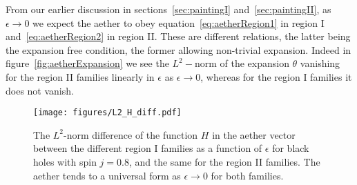 \documentclass[12pt]{article}
\numberwithin{equation}{section}
\begin{document}
From our earlier discussion in  sections~\ref{sec:paintingI} and~\ref{sec:paintingII}, as $\epsilon \to 0$  we expect the aether to obey equation~\eqref{eq:aetherRegion1} in region I and~\eqref{eq:aetherRegion2} in region II. These are different relations, the latter being the expansion free condition, the former allowing non-trivial expansion. Indeed in figure~\ref{fig:aetherExpansion} we see the $L^2-$norm of the expansion $\theta$ vanishing for the region II families linearly in $\epsilon$ as $\epsilon \to 0$, whereas for the region I families it does not vanish. 


\begin{figure}
\centerline{
  \texttt{[image: figures/L2\_H\_diff.pdf]}
  }
  \caption{\label{fig:aetherLimit}
 The $L^2$-norm difference of the function  $H$ in the aether vector between the different region I families as a function of  $\epsilon$ for black holes with spin $j=0.8$, and the same for the region II families. 
     The aether tends to a universal form as $\epsilon \to 0$ for both families.
     }
\end{figure}
\end{document}
